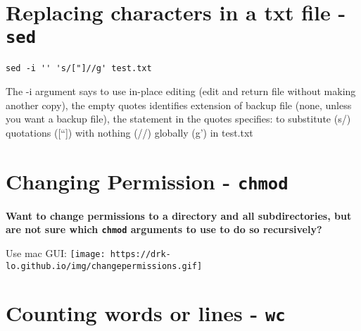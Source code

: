\documentclass[
  letterpaper,
  DIV=11,
  numbers=noendperiod]{scrreprt}
\begin{document}
\hypertarget{replacing-characters-in-a-txt-file--sed}{%
\section*{\texorpdfstring{\textbf{Replacing characters in a txt file
-\texttt{sed}}}{Replacing characters in a txt file -sed}}\label{replacing-characters-in-a-txt-file--sed}}


\begin{verbatim}
sed -i '' 's/["]//g' test.txt
\end{verbatim}

The -i argument says to use in-place editing (edit and return file
without making another copy), the empty quotes identifies extension of
backup file (none, unless you want a backup file), the statement in the
quotes specifies: to substitute (s/) quotations ({[}``{]}) with nothing
(//) globally (g') in test.txt

\hypertarget{changing-permission---chmod}{%
\section*{\texorpdfstring{\textbf{Changing Permission -
\texttt{chmod}}}{Changing Permission - chmod}}\label{changing-permission---chmod}}


\textbf{Want to change permissions to a directory and all
subdirectories, but are not sure which \texttt{chmod} arguments to use
to do so recursively?}

Use mac GUI:
\texttt{[image: https://drk-lo.github.io/img/changepermissions.gif]}

\hypertarget{counting-words-or-lines---wc}{%
\section*{\texorpdfstring{\textbf{Counting words or lines -
\texttt{wc}}}{Counting words or lines - wc}}\label{counting-words-or-lines---wc}}

\end{document}
